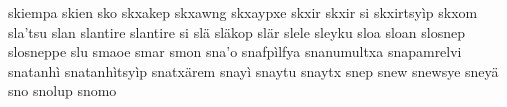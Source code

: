 \documentclass[a4paper]{article}
\begin{document}
skiempa\hspace{2mm}
skien\hspace{2mm}
sko\hspace{2mm}
skxakep\hspace{2mm}
skxawng\hspace{2mm}
skxaypxe\hspace{2mm}
skxir\hspace{2mm}
skxir si\hspace{2mm}
skxirtsyìp\hspace{2mm}
skxom\hspace{2mm}
sla'tsu\hspace{2mm}
slan\hspace{2mm}
slantire\hspace{2mm}
slantire si\hspace{2mm}
slä\hspace{2mm}
släkop\hspace{2mm}
slär\hspace{2mm}
slele\hspace{2mm}
sleyku\hspace{2mm}
sloa\hspace{2mm}
sloan\hspace{2mm}
slosnep\hspace{2mm}
slosneppe\hspace{2mm}
slu\hspace{2mm}
smaoe\hspace{2mm}
smar\hspace{2mm}
smon\hspace{2mm}
sna'o\hspace{2mm}
snafpìlfya\hspace{2mm}
snanumultxa\hspace{2mm}
snapamrelvi\hspace{2mm}
snatanhì\hspace{2mm}
snatanhìtsyìp\hspace{2mm}
snatxärem\hspace{2mm}
snayì\hspace{2mm}
snaytu\hspace{2mm}
snaytx\hspace{2mm}
snep\hspace{2mm}
snew\hspace{2mm}
snewsye\hspace{2mm}
sneyä\hspace{2mm}
sno\hspace{2mm}
snolup\hspace{2mm}
snomo\hspace{2mm}
\end{document}
